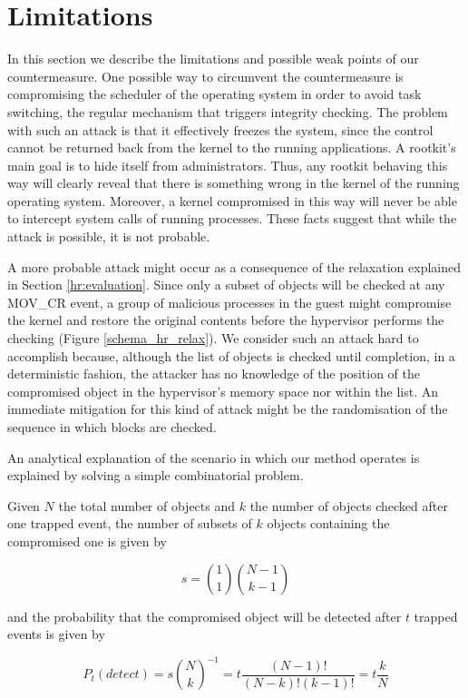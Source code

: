 \section{Limitations}\label{hr:limitations}
In this section we describe the limitations and possible weak points of our countermeasure.
One possible way to circumvent the countermeasure is compromising the scheduler of the operating system in order to avoid task switching, the regular mechanism that triggers integrity checking. The problem with such an attack is that it effectively freezes the system, since the control cannot be returned back from the kernel to the running applications.
A rootkit's main goal is to hide itself from administrators. Thus, any rootkit behaving this way will clearly reveal that there is something wrong in the kernel of the running operating system. Moreover, a kernel compromised in this way will never be able to intercept system calls of running processes. These facts suggest that while the attack is possible, it is not probable.

A more probable attack might occur as a consequence of the relaxation explained in Section \ref{hr:evaluation}.
Since only a subset of objects will be checked at any MOV\_CR event, a group of malicious processes in the guest might compromise the kernel and restore the original contents before the hypervisor performs the checking (Figure \ref{schema_hr_relax}).
We consider such an attack hard to accomplish because, although the list of objects is checked until completion, in a deterministic fashion, the attacker has no knowledge of the position of the compromised object in the hypervisor's memory space nor within the list.
An immediate mitigation for this kind of attack might be the randomisation of the sequence in which blocks are checked.

An analytical explanation of the scenario in which our method operates is explained by solving a simple combinatorial problem.
  
Given $N$ the total number of objects and $k$ the number of objects checked after one trapped event,  the number of subsets of $k$ objects containing the compromised one is given by

$$ s = \binom{1}{1} \binom{N-1}{k-1} $$ 

and the probability that the compromised object will be detected after $t$ trapped events is given by

$$P_t(detect) = s {\binom{N}{k}}^{-1}= t \frac{(N-1)!}{(N-k)!(k-1)!} = t \frac{k}{N}$$


